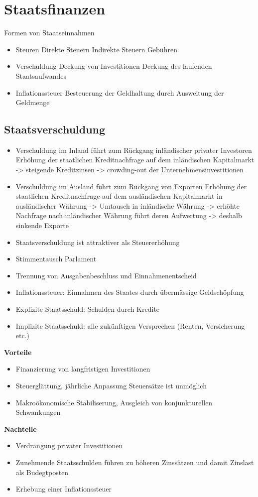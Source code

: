 \section{Staatsfinanzen}
Formen von Staatseinnahmen
\begin{itemize}
	\item Steuren
	\subitem Direkte Steuern
	\subitem Indirekte Steuern
	\subitem Gebühren
	\item Verschuldung
	\subitem Deckung von Investitionen
	\subitem Deckung des laufenden Staatsaufwandes
	\item Inflationssteuer
	\subitem Besteuerung der Geldhaltung durch Ausweitung der Geldmenge
\end{itemize}
\subsection{Staatsverschuldung}
\begin{itemize}
	\item Verschuldung im Inland führt zum Rückgang inländischer privater Investoren
	\subitem Erhöhung der staatlichen Kreditnachfrage auf dem inländischen Kapitalmarkt -> steigende Kreditzinsen -> crowding-out der Unternehmensinvestitionen
	\item Verschuldung im Ausland führt zum Rückgang von Exporten
	\subitem Erhöhung der staatlichen Kreditnachfrage auf dem ausländischen Kapitalmarkt in ausländischer Währung -> Umtausch in inländische Währung -> erhöhte Nachfrage nach inländischer Währung führt deren Aufwertung -> deshalb sinkende Exporte
	\item Staatsverschuldung ist attraktiver als Steuererhöhung
	\item Stimmentausch Parlament
	\item Trennung von Ausgabenbeschluss und Einnahmenentscheid
	\item Inflationssteuer: Einnahmen des Staates durch übermässige Geldschöpfung
	\item Explizite Staatsschuld: Schulden durch Kredite
	\item Implizite Staatsschuld: alle zukünftigen Versprechen (Renten, Versicherung etc.)
\end{itemize}
\begin{multicols}{2}
	\textbf{Vorteile}
	\begin{itemize}
		\item Finanzierung von langfristigen Investitionen
		\item Steuerglättung, jährliche Anpassung Steuersätze ist unmöglich
		\item Makroökonomische Stabiliserung, Ausgleich von konjunkturellen Schwankungen
	\end{itemize}
	\textbf{Nachteile}
	\begin{itemize}
		\item Verdrängung privater Investitionen
		\item Zunehmende Staatsschulden führen zu höheren Zinssätzen und damit Zinslast als Budegtposten
		\item Erhebung einer Inflationssteuer
	\end{itemize}
\end{multicols}
